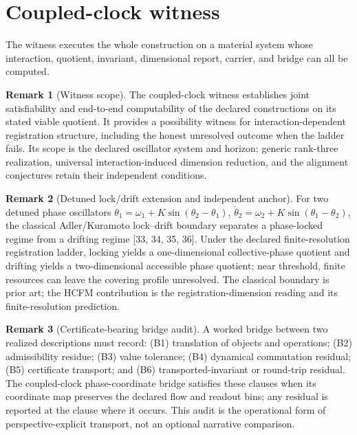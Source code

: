 \documentclass[11pt]{article}
\theoremstyle{definition}
\newtheorem{remark}{Remark}
\begin{document}
\section{Coupled-clock witness}

The witness executes the whole construction on a material system whose interaction, quotient, invariant, dimensional report, carrier, and bridge can all be computed.

\begin{remark}[Witness scope]
The coupled-clock witness establishes joint satisfiability and end-to-end computability of the declared constructions on its stated viable quotient. It provides a possibility witness for interaction-dependent registration structure, including the honest unresolved outcome when the ladder fails. Its scope is the declared oscillator system and horizon; generic rank-three realization, universal interaction-induced dimension reduction, and the alignment conjectures retain their independent conditions.
\end{remark}

\begin{remark}[Detuned lock/drift extension and independent anchor]
For two detuned phase oscillators $\dot{\theta}_1 = \omega_1 + K \sin(\theta_2 - \theta_1)$, $\dot{\theta}_2 = \omega_2 + K \sin(\theta_1 - \theta_2)$, the classical Adler/Kuramoto lock--drift boundary separates a phase-locked regime from a drifting regime [33, 34, 35, 36]. Under the declared finite-resolution registration ladder, locking yields a one-dimensional collective-phase quotient and drifting yields a two-dimensional accessible phase quotient; near threshold, finite resources can leave the covering profile unresolved. The classical boundary is prior art; the HCFM contribution is the registration-dimension reading and its finite-resolution prediction.
\end{remark}

\begin{remark}[Certificate-bearing bridge audit]
A worked bridge between two realized descriptions must record: (B1) translation of objects and operations; (B2) admissibility residue; (B3) value tolerance; (B4) dynamical commutation residual; (B5) certificate transport; and (B6) transported-invariant or round-trip residual. The coupled-clock phase-coordinate bridge satisfies these clauses when its coordinate map preserves the declared flow and readout bins; any residual is reported at the clause where it occurs. This audit is the operational form of perspective-explicit transport, not an optional narrative comparison.
\end{remark}
\end{document}
